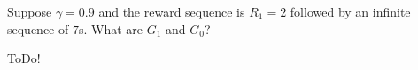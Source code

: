 
\begin{exercise}[Exercise 3.9]

Suppose $\gamma = 0.9$ and the reward sequence is $R_1 = 2$ followed by an infinite sequence of $7$s.
What are $G_1$ and $G_0$?    

\end{exercise}


\begin{solution}

ToDo!

\end{solution}

